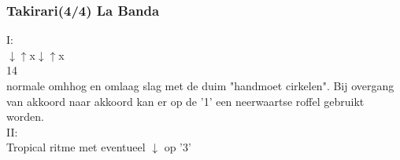 \subsubsection*{Takirari(4/4) La Banda}
I:\\
$\downarrow$\hspace{1.8em}$\uparrow$\hspace{2.1em}x\hspace{2em}$\downarrow$\hspace{1.8em}$\uparrow$\hspace{2.1em}x\\
1\hspace{2em}{\footnotesize 2}\hspace{2em}{\footnotesize 3}\hspace{2em}4\hspace{2em}{\footnotesize 5}\hspace{2em}{\footnotesize 6}\\
normale omhhog en omlaag slag met de duim "handmoet cirkelen". Bij overgang van akkoord naar akkoord kan er op de '1' een neerwaartse roffel gebruikt worden.\\
II:\\
Tropical ritme met eventueel $\downarrow$ op '3'\\


